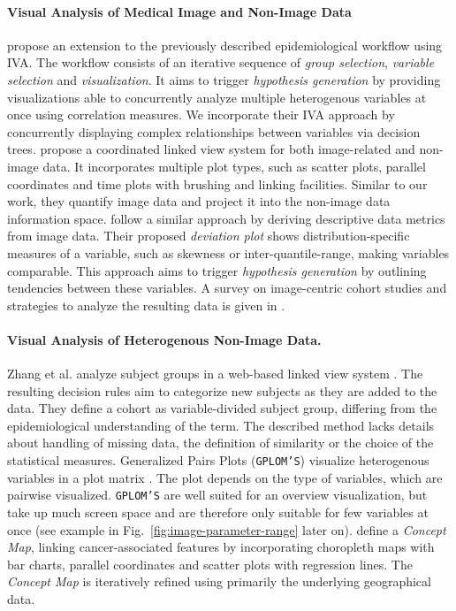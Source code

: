 \documentclass[a4paper,twoside]{style/article}
\begin{document}
\paragraph{Visual Analysis of Medical Image and Non-Image Data}
\cite{Klemm2014VIS} propose an extension to the previously described epidemiological workflow using IVA.
The workflow consists of an iterative sequence of \emph{group selection}, \emph{variable selection} and \emph{visualization}.
It aims to trigger \emph{hypothesis generation} by providing visualizations able to concurrently analyze multiple heterogenous variables at once using correlation measures.
We incorporate their IVA approach by concurrently displaying complex relationships between variables via decision trees.
\cite{Steenwijk} propose a coordinated linked view system for both image-related and non-image data.
It incorporates multiple plot types, such as scatter plots, parallel coordinates and time plots with brushing and linking facilities.
Similar to our work, they quantify image data and project it into the non-image data information space.
\cite{Turkay} follow a similar approach by deriving descriptive data metrics from image data.
Their proposed \emph{deviation plot} shows distribution-specific measures of a variable, such as skewness or inter-quantile-range, making variables comparable.
This approach aims to trigger \emph{hypothesis generation} by outlining tendencies between these variables.
A survey on image-centric cohort studies and strategies to analyze the resulting data is given in \cite{Preim2014}.
\paragraph{Visual Analysis of Heterogenous Non-Image Data.}
Zhang et al. analyze subject groups in a web-based linked view system \cite{Zhang}.
The resulting decision rules aim to categorize new subjects as they are added to the data.
They define a cohort as variable-divided subject group, differing from the epidemiological understanding of the term.
The described method lacks details about handling of missing data, the definition of similarity or the choice of the statistical measures.
Generalized Pairs Plots (\texttt{GPLOM'S}) visualize heterogenous variables in a plot matrix \cite{GPLOMS,Francois}.
The plot depends on the type of variables, which are pairwise visualized.
\texttt{GPLOM'S} are well suited for an overview visualization, but take up much screen space and are therefore only suitable for few variables at once (see example in Fig.~\ref{fig:image-parameter-range} later on).
\cite{Dai} define a \emph{Concept Map}, linking cancer-associated features by incorporating choropleth maps with bar charts, parallel coordinates and scatter plots with regression lines.
The \emph{Concept Map} is iteratively refined using primarily the underlying geographical data.
\end{document}
